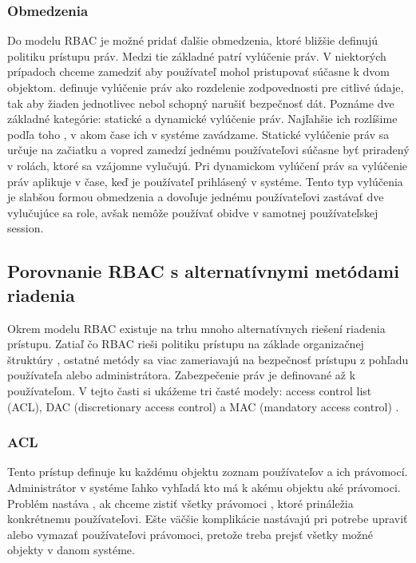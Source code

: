 \subsubsection{Obmedzenia}
Do modelu RBAC je možné pridať ďalšie obmedzenia, ktoré bližšie definujú politiku prístupu práv. Medzi tie základné patrí vylúčenie práv. V niektorých prípadoch chceme zamedziť aby používateľ mohol pristupovať súčasne k dvom objektom. \cite{telecom} definuje vylúčenie práv ako rozdelenie zodpovednosti pre citlivé údaje, tak aby žiaden jednotlivec nebol schopný narušiť bezpečnosť dát. Poznáme dve základné kategórie: statické a dynamické vylúčenie práv. Najľahšie ich rozlíšime podľa toho , v akom čase ich v systéme zavádzame. Statické vylúčenie práv sa určuje na začiatku a vopred zamedzí jednému používateľovi súčasne byť priradený v rolách, ktoré sa vzájomne vylučujú. Pri dynamickom vylúčení práv sa vylúčenie práv aplikuje v čase, keď je používateľ prihlásený v systéme. Tento typ vylúčenia je slabšou formou obmedzenia a dovoľuje jednému používateľovi zastávať dve vylučujúce sa role, avšak nemôže používať obidve v samotnej používateľskej session.



\subsection{Porovnanie RBAC s alternatívnymi metódami riadenia}
Okrem modelu RBAC existuje na trhu mnoho alternatívnych riešení riadenia prístupu. Zatiaľ čo RBAC rieši politiku prístupu na základe organizačnej štruktúry , ostatné metódy sa viac zameriavajú na bezpečnosť prístupu z pohľadu používateľa alebo administrátora. Zabezpečenie práv je definované až k používateľom.
V tejto časti si ukážeme tri časté modely: access control list (ACL), DAC (discretionary access control) a MAC (mandatory access control) .


\subsubsection{ACL}
Tento prístup definuje ku každému objektu zoznam používateľov a ich právomocí. Administrátor v systéme ľahko vyhľadá kto má k akému objektu aké právomoci. Problém nastáva , ak chceme zistiť všetky právomoci , ktoré prináležia konkrétnemu používateľovi. Ešte väčšie komplikácie nastávajú pri potrebe upraviť alebo vymazať používateľovi  právomoci, pretože treba prejsť všetky možné objekty v danom systéme. 




